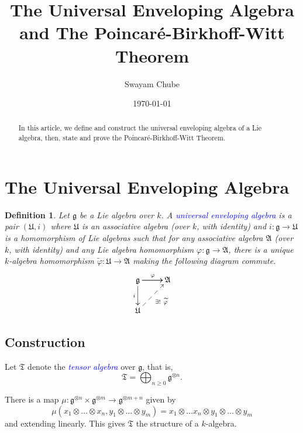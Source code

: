 \documentclass[12pt]{article}
\title{The Universal Enveloping Algebra and The Poincar\'e-Birkhoff-Witt Theorem}
\author{Swayam Chube}
\date{\today}
\theoremstyle{thmstyle}
\theoremstyle{defstyle}
\newtheorem{definition}[theorem]{Definition}
\newcommand{\frakT}{\mathfrak{T}}
\newcommand{\frakg}{\mathfrak{g}}
\newcommand{\frakA}{\mathfrak{A}}
\newcommand{\frakU}{\mathfrak{U}}
\newcommand{\wt}[1]{\widetilde{#1}}
\newcommand{\define}[1]{\textcolor{blue}{\textit{#1}}}
\renewcommand{\ge}{\geqslant}
\begin{document}
\maketitle

\begin{abstract}
    In this article, we define and construct the universal enveloping algebra of a Lie algebra, then, state and prove the Poincar\'e-Birkhoff-Witt Theorem.
\end{abstract}

\section{The Universal Enveloping Algebra}

\begin{definition}
    Let $\frakg$ be a Lie algebra over $k$. A \define{universal enveloping algebra} is a pair $(\frakU, i)$ where $\frakU$ is an associative algebra (over $k$, with identity) and $i: \frakg\to\frakU$ is a homomorphism of Lie algebras such that for any associative algebra $\frakA$ (over $k$, with identity) and any Lie algebra homomorphism $\varphi:\frakg\to\frakA$, there is a unique $k$-algebra homomorphism $\wt\varphi:\frakU\to\frakA$ making the following diagram commute.
    \begin{equation*}
        \xymatrix {
            \frakg\ar[r]\ar[d]_{i}\ar[r]^{\varphi} & \frakA\\
            \frakU\ar@{-->}[ru]_{\exists!~\wt\varphi}
        }
    \end{equation*}
\end{definition}

\subsection{Construction}

Let $\frakT$ denote the \define{tensor algebra} over $\frakg$, that is, 
\begin{equation*}
    \frakT = \bigoplus_{n\ge 0}\frakg^{\otimes n}.
\end{equation*}

There is a map $\mu:\frakg^{\otimes n}\times\frakg^{\otimes m}\to\frakg^{\otimes m + n}$ given by 
\begin{equation*}
    \mu(x_1\otimes\dots\otimes x_n, y_1\otimes\dots\otimes y_m) = x_1\otimes\dots x_n\otimes y_1\otimes\dots\otimes y_m
\end{equation*}
and extending linearly. This gives $\frakT$ the structure of a $k$-algebra. 
\end{document}
